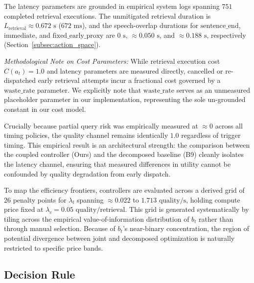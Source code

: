 The latency parameters are grounded in empirical system logs spanning $751$ completed retrieval executions. The unmitigated retrieval duration is $L_{\text{retrieval}} \approx 0.672\text{ s}$ ($672\text{ ms}$), and the speech-overlap durations for $\text{sentence\_end}$, $\text{immediate}$, and $\text{fixed\_early\_proxy}$ are $0\text{ s}$, $\approx 0.050\text{ s}$, and $\approx 0.188\text{ s}$, respectively (Section~\ref{subsec:action_space}).

\textit{Methodological Note on Cost Parameters:} While retrieval execution cost $C(a_t) = 1.0$ and latency parameters are measured directly, cancelled or re-dispatched early retrieval attempts incur a fractional cost governed by a $\text{waste\_rate}$ parameter. We explicitly note that $\text{waste\_rate}$ serves as an unmeasured placeholder parameter in our implementation, representing the sole un-grounded constant in our cost model.

Crucially because partial query risk was empirically measured at $\approx 0$ across all timing policies, the quality channel remains identically $1.0$ regardless of trigger timing. This empirical result is an architectural strength: the comparison between the coupled controller (Ours) and the decomposed baseline (B9) cleanly isolates the latency channel, ensuring that measured differences in utility cannot be confounded by quality degradation from early dispatch.

To map the efficiency frontiers, controllers are evaluated across a derived grid of $26$ penalty points for $\lambda_l$ spanning $\approx 0.022$ to $1.713\text{ quality/s}$, holding compute price fixed at $\lambda_c = 0.05\text{ quality/retrieval}$. This grid is generated systematically by tiling across the empirical value-of-information distribution of $b_t$ rather than through manual selection. Because of $b_t$'s near-binary concentration, the region of potential divergence between joint and decomposed optimization is naturally restricted to specific price bands.


\subsection{Decision Rule}
\label{subsec:decision_rule}

